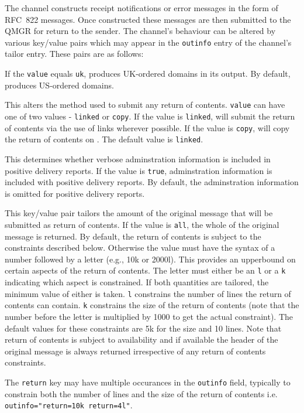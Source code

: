 The  channel constructs receipt
notifications or error messages in the form of RFC~822 messages.
Once constructed these messages are then submitted to the QMGR
for return to the sender.
The channel's behaviour can be altered by various key/value pairs which
may appear in the \verb+outinfo+ entry of the channel's tailor entry.
These pairs are as follows:
\begin{describe}
\item[\verb|order=value|:] If the \verb|value| equals \verb|uk|,
 produces UK-ordered domains in its output.
By default,  produces US-ordered domains.

\item[\verb|submit=value|:] This alters the method used to submit any
return of contents.
\verb+value+ can have one of two values - \verb+linked+ or
\verb+copy+.
If the value is \verb+linked+,  will submit the return of
contents via the use of links wherever possible.
If the value is \verb+copy+,  will copy the return of
contents on .
The default value is \verb+linked+.

\item[\verb|admininfo=value|:] This determines whether verbose
adminstration information is included in positive delivery reports.
If the value is \verb+true+, adminstration information is included
with positive delivery reports.
By default, the adminstration information is omitted for positive
delivery reports.

\item[\verb|return=value|:] This key/value pair tailors the amount of the
original message that will be submitted as return of contents.
If the value is \verb+all+, the whole of the original message is
returned.
By default, the return of contents is subject to the constraints
described below.
Otherwise the value must have the syntax of a number followed by a
letter (e.g., 10k or 2000l).
This provides an upperbound on certain aspects of the return of contents.
The letter must either be an \verb+l+ or a \verb+k+ indicating
which aspect is constrained. If both quantities are tailored, the
minimum value of either is taken.
\verb+l+ constrains the number of lines the return of contents can
contain.
\verb+k+ constrains the size of the return of contents (note that the
number before the letter is multiplied by 1000 to get the actual
constraint).
The default values for these constraints are 5k for the size and 10
lines.
Note that return of contents is subject to availability and if
available the header of the original message is always returned
irrespective of any return of contents constraints.

The \verb|return| key may have multiple occurances in the \verb|outinfo|
field, typically to constrain both the number of lines and the size of
the return of contents i.e. \verb|outinfo="return=10k return=4l"|.

\end{describe}

